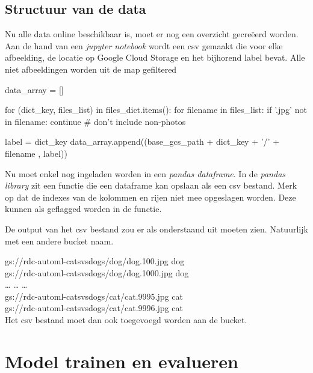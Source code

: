 \subsection{Structuur van de data}
\label{subsec:google-structure}

Nu alle data online beschikbaar is, moet er nog een overzicht gecreëerd worden. Aan de hand van een \textit{jupyter notebook} wordt een csv gemaakt die voor elke afbeelding, de locatie op Google Cloud Storage en het bijhorend label bevat. Alle niet afbeeldingen worden uit de map gefiltered

\begin{python}
data_array = []

for (dict_key, files_list) in files_dict.items():
    for filename in files_list:
        if '.jpg' not in filename:
            continue # don't include non-photos
            
        label = dict_key
        data_array.append((base_gcs_path + dict_key + '/' + filename , label))

\end{python}

Nu moet  enkel nog ingeladen worden in een \textit{pandas dataframe}. In de \textit{pandas library} zit een functie die een dataframe kan opslaan als een csv bestand. Merk op dat de indexes van de kolommen en rijen niet mee opgeslagen worden. Deze kunnen als  geflagged worden in de functie.


De output van het csv bestand zou er als onderstaand uit moeten zien. Natuurlijk met een andere bucket naam.

gs://rdc-automl-catsvsdogs/dog/dog.100.jpg dog \\
gs://rdc-automl-catsvsdogs/dog/dog.1000.jpg dog \\
… … … \\
gs://rdc-automl-catsvsdogs/cat/cat.9995.jpg cat \\
gs://rdc-automl-catsvsdogs/cat/cat.9996.jpg cat
\\

Het csv bestand moet dan ook toegevoegd worden aan de bucket.

\section{Model trainen en evalueren}
\label{sec:google-automl-train}


